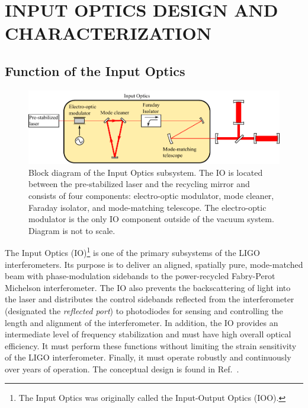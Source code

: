 \chapter{INPUT OPTICS DESIGN AND CHARACTERIZATION}

\section{Function of the Input Optics}
\label{sec:role}

\begin{figure}
\begin{centering}
\includegraphics{figures/InputOpticsBlock_thesis.pdf}
\caption[Block diagram of the Input Optics subsystem.]{Block diagram
  of the Input Optics subsystem. The IO is located between the
  pre-stabilized laser and the recycling mirror and consists of four
  components: electro-optic modulator, mode cleaner, Faraday isolator,
  and mode-matching telescope. The electro-optic modulator is the only
  IO component outside of the vacuum system. Diagram is not to scale.}
\label{fig:IOblock}
\end{centering}
\end{figure}

The Input Optics (IO)\footnote{The Input Optics was originally called
  the Input-Output Optics (IOO).} is one of the primary subsystems of the LIGO
interferometers. Its purpose is to deliver an aligned, spatially
pure, mode-matched beam with phase-modulation sidebands to the
power-recycled Fabry-Perot Michelson interferometer. The IO also
prevents the backscattering of light into the laser and distributes
the control sidebands reflected from the interferometer (designated
the \emph{reflected port}) to photodiodes for sensing and controlling
the length and alignment of the interferometer. In addition, the IO
provides an intermediate level of frequency stabilization and must
have high overall optical efficiency. It must perform these functions
without limiting the strain sensitivity of the LIGO interferometer.
Finally, it must operate robustly and continuously over years of
operation. The conceptual design is found in
Ref.~\citep{Camp1996InputOutput}.

